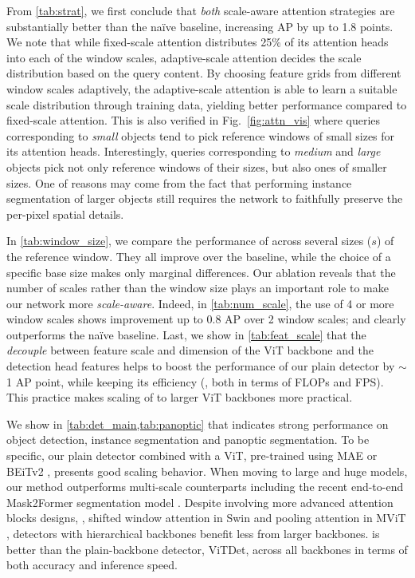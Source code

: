 From \cref{tab:strat}, we first conclude that \emph{both} scale-aware attention strategies are substantially better than the na\"ive baseline, increasing AP by up to 1.8 points. We note that while fixed-scale attention distributes 25\% of its attention heads into each of the window scales, adaptive-scale attention decides the scale distribution based on the query content. By choosing feature grids from different window scales adaptively, the adaptive-scale attention is able to learn a suitable scale distribution through training data, yielding better performance compared to fixed-scale attention. This is also verified in Fig.~\ref{fig:attn_vis} where queries corresponding to \emph{small} objects tend to pick reference windows of small sizes for its attention heads. Interestingly, queries corresponding to \emph{medium} and \emph{large} objects pick not only reference windows of their sizes, but also ones of smaller sizes. One of reasons may come from the fact that performing instance segmentation of larger objects still requires the network to faithfully preserve the per-pixel spatial details.

In \cref{tab:window_size}, we compare the performance of \ours across several sizes ($s$) of the reference window. They all improve over the baseline, while the choice of a specific base size makes only marginal differences. Our ablation reveals that the number of scales rather than the window size plays an important role to make our network more \emph{scale-aware}. Indeed, in \cref{tab:num_scale}, the use of 4 or more window scales shows improvement up to 0.8 AP over 2 window scales; and clearly outperforms the na\"ive baseline. Last, we show in \cref{tab:feat_scale} that the \emph{decouple} between feature scale and dimension of the ViT backbone and the detection head features helps to boost the performance of our plain detector by $\sim$1 AP point, while keeping its efficiency (\ie, both in terms of FLOPs and FPS). This practice makes scaling of \ours to larger ViT backbones more practical.

We show in \cref{tab:det_main,tab:panoptic} that \ours indicates strong performance on object detection, instance segmentation and panoptic segmentation. To be specific, our plain detector combined with a ViT, pre-trained using MAE \citep{he2022mae} or BEiTv2 \citep{peng2022beitv2}, presents good scaling behavior. When moving to large and huge models, our method outperforms multi-scale counterparts including the recent end-to-end Mask2Former segmentation model \citep{cheng2022mask2former}. Despite involving more advanced attention blocks designs, \ie, shifted window attention in Swin \citep{liu2021swintransformer} and pooling attention in MViT \citep{fan2021mvit}, detectors with hierarchical backbones benefit less from larger backbones. \ours is better than the plain-backbone detector, ViTDet, across all backbones in terms of both accuracy and inference speed.
    
